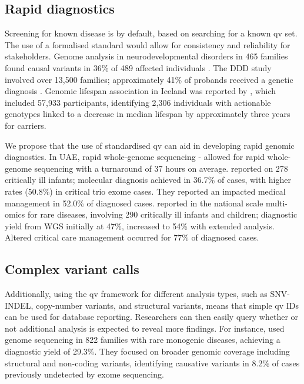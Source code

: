 \subsection{Rapid diagnostics}
Screening for known disease is by default, based on searching for a known \ac{qv} set. 
The use of a formalised standard would allow for consistency and reliability for stakeholders. 
Genome analysis in neurodevelopmental disorders in 465 families found causal variants in 36\% of 489 affected individuals \citep{sanchis2023genome}.
The DDD study involved over 13,500 families; approximately 41\% of probands received a genetic diagnosis \cite{wright2023genomic}.
Genomic lifespan association in Iceland was reported by \citet{jensson2023actionable}, which included 57,933 participants, identifying 2,306 individuals with actionable genotypes linked to a decrease in median lifespan by approximately three years for carriers.

We propose that the use of standardised \ac{qv} can aid in developing rapid genomic diagnostics. 
In UAE, rapid whole-genome sequencing - \citep{abou2023rapid}
allowed for rapid whole-genome sequencing with a turnaround of 37 hours on average.
\citet{meng2017use} reported on 278 critically ill infants; molecular diagnosis achieved in 36.7\% of cases, with higher rates (50.8\%) in critical trio exome cases. They reported an impacted medical management in 52.0\% of diagnosed cases.
\citet{lunke2023integrated} reported in the national scale multi-omics for rare diseases, involving 290 critically ill infants and children; diagnostic yield from WGS initially at 47\%, increased to 54\% with extended analysis.
Altered critical care  management occurred for 77\% of diagnosed cases.

\subsection{Complex variant calls}
Additionally, using the \ac{qv} framework for different analysis types, such as SNV-INDEL, copy-number variants, and structural variants, means that simple \ac{qv} IDs can be used for database reporting. 
Researchers can then easily query whether or not additional analysis is expected to reveal more findings. 
For instance,
\citet{wojcik2024genome} used genome sequencing in 822 families with rare monogenic diseases, achieving a diagnostic yield of 29.3\%.
They focused on broader genomic coverage including structural and non-coding variants, identifying causative variants in 8.2\% of cases previously undetected by exome sequencing.


